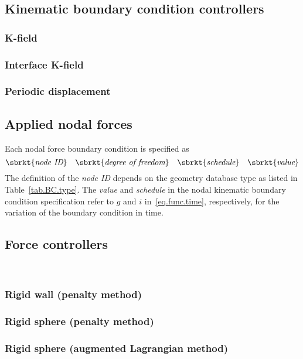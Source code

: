 \subsection{Kinematic boundary condition controllers}
\label{set.ICandBC.KBC.controller}
\subsubsection{K-field}
\subsubsection{Interface K-field}
\subsubsection{Periodic displacement}
\subsection{Applied nodal forces}
\label{set.ICandBC.FBC}
Each nodal force boundary condition is specified as
\[
\sbrkt{\textit{node ID}} \quad 
\sbrkt{\textit{degree of freedom}} \quad
\sbrkt{\textit{schedule}} \quad
\sbrkt{\textit{value}}
\]
The definition of the \textit{node ID} depends on the geometry 
database type as listed in Table~\ref{tab.BC.type}. 
The \textit{value} and \textit{schedule} in the nodal kinematic 
boundary condition specification refer to 
$g$ and $i$ in~\eqref{eq.func.time}, respectively, for the variation 
of the boundary condition in time.

\subsection{Force controllers}
\label{set.ICandBC.FBC.controller}
\\
\subsubsection{Rigid wall (penalty method)}
\subsubsection{Rigid sphere (penalty method)}
\subsubsection{Rigid sphere (augmented Lagrangian method)}
